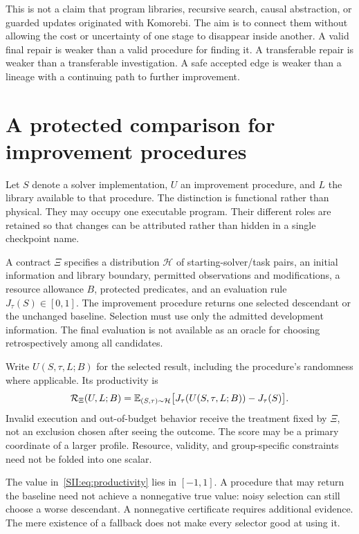 This is not a claim that program libraries, recursive search, causal abstraction, or guarded updates originated with Komorebi. The aim is to connect them without allowing the cost or uncertainty of one stage to disappear inside another. A valid final repair is weaker than a valid procedure for finding it. A transferable repair is weaker than a transferable investigation. A safe accepted edge is weaker than a lineage with a continuing path to further improvement.

\section{A protected comparison for improvement procedures}\label{SII:sec:contract}
Let $S$ denote a solver implementation, $U$ an improvement procedure, and $L$ the library available to that procedure. The distinction is functional rather than physical. They may occupy one executable program. Their different roles are retained so that changes can be attributed rather than hidden in a single checkpoint name.

\begin{SIIdefinition}\label{SII:def:contract}
A contract $\Xi$ specifies a distribution $\mathcal H$ of starting-solver/task pairs, an initial information and library boundary, permitted observations and modifications, a resource allowance $B$, protected predicates, and an evaluation rule $J_\tau(S)\in[0,1]$. The improvement procedure returns one selected descendant or the unchanged baseline. Selection must use only the admitted development information. The final evaluation is not available as an oracle for choosing retrospectively among all candidates.
\end{SIIdefinition}

Write $U(S,\tau,L;B)$ for the selected result, including the procedure's randomness where applicable. Its productivity is
\begin{equation}\label{SII:eq:productivity}
\mathcal R_\Xi(U,L;B)=\mathbb E_{(S,\tau)\sim\mathcal H}
\big[J_\tau(U(S,\tau,L;B))-J_\tau(S)\big].
\end{equation}
Invalid execution and out-of-budget behavior receive the treatment fixed by $\Xi$, not an exclusion chosen after seeing the outcome. The score may be a primary coordinate of a larger profile. Resource, validity, and group-specific constraints need not be folded into one scalar.

The value in~\eqref{SII:eq:productivity} lies in $[-1,1]$. A procedure that may return the baseline need not achieve a nonnegative true value: noisy selection can still choose a worse descendant. A nonnegative certificate requires additional evidence. The mere existence of a fallback does not make every selector good at using it.

